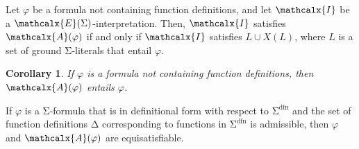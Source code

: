 \documentclass[runningheads,a4paper]{llncs}
\newcommand\DDD{\Delta}
\let\oldSigma=\Sigma
\def\Sigma{\mathrm{\oldSigma}}
\let\oldDelta=\Delta
\def\Delta{\mathrm{\oldDelta}}
\newcommand{\I}{\mathcalx{I}}
\newcommand{\conv}{\mathcalx{A}}
\newcommand{\sfundefs}[1]{#1^\mathrm{dfn}}
\newcommand{\extendsig}[1]{\mathcalx{E}( #1 )}
\newcommand{\absconstraints}{X}
\newtheorem{cor}{Corollary}
\begin{document}
\begin{lemma}\label{lem:conv}
Let $\varphi$ be a formula not containing function definitions,
and let $\I$ be a $\extendsig{\Sigma}$-interpretation.
Then, $\I$ satisfies $\conv( \varphi )$ if and only if
$\I$ satisfies $L \cup \absconstraints( L )$, where $L$ is a set of ground $\Sigma$-literals that entail $\varphi$.
\end{lemma}

\begin{cor}\label{cor:conv}
If $\varphi$ is a formula not containing function definitions, then $\conv( \varphi )$ entails $\varphi$.
\end{cor}

\begin{theorem}\label{thm:equi}
If $\varphi$ is a\/ $\Sigma$-formula that is in definitional form with respect to\/
$\sfundefs{\Sigma}$
and the set of function definitions\/ $\DDD$ corresponding to functions in
$\sfundefs{\Sigma}$ is admissible, then\/ $\varphi$ and\/ $\conv( \varphi )$ are
equisatisfiable.
\end{theorem}
\end{document}

